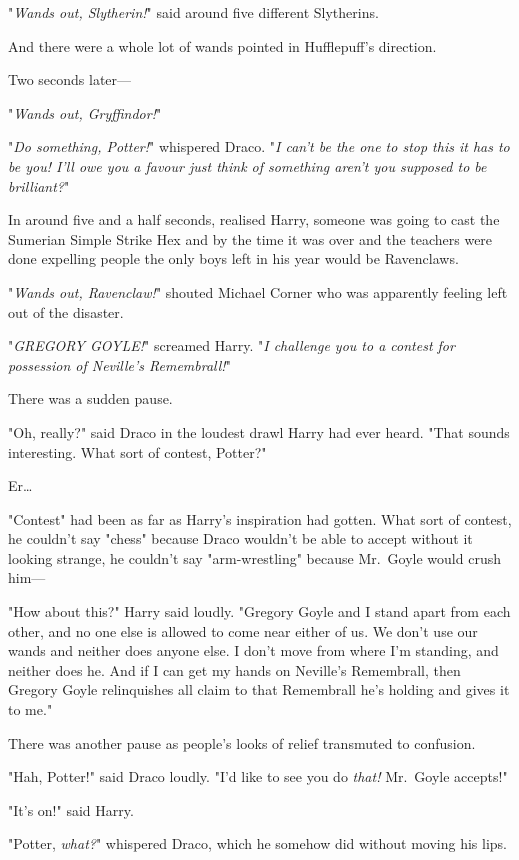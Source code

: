 "\emph{Wands out, Slytherin!}" said around five different Slytherins.

And there were a whole lot of wands pointed in Hufflepuff's direction.

Two seconds later---

"\emph{Wands out, Gryffindor!}"

"\emph{Do something, Potter!}" whispered Draco. "\emph{I can't be the one to 
stop this it has to be you! I'll owe you a favour just think of something 
aren't you supposed to be brilliant?}"

In around five and a half seconds, realised Harry, someone was going to cast 
the Sumerian Simple Strike Hex and by the time it was over and the teachers 
were done expelling people the only boys left in his year would be Ravenclaws.

"\emph{Wands out, Ravenclaw!}" shouted Michael Corner who was apparently 
feeling left out of the disaster.

"\emph{GREGORY GOYLE!}" screamed Harry. "\emph{I challenge you to a contest for 
possession of Neville's Remembrall!}"

There was a sudden pause.

"Oh, really?" said Draco in the loudest drawl Harry had ever heard. "That 
sounds interesting. What sort of contest, Potter?"

Er{\ldots}

"Contest" had been as far as Harry's inspiration had gotten. What sort of 
contest, he couldn't say "chess" because Draco wouldn't be able to accept 
without it looking strange, he couldn't say "arm-wrestling" because Mr.~Goyle 
would crush him---

"How about this?" Harry said loudly. "Gregory Goyle and I stand apart from each 
other, and no one else is allowed to come near either of us. We don't use our 
wands and neither does anyone else. I don't move from where I'm standing, and 
neither does he. And if I can get my hands on Neville's Remembrall, then 
Gregory Goyle relinquishes all claim to that Remembrall he's holding and gives 
it to me."

There was another pause as people's looks of relief transmuted to confusion.

"Hah, Potter!" said Draco loudly. "I'd like to see you do \emph{that!} 
Mr.~Goyle accepts!"

"It's on!" said Harry.

"Potter, \emph{what?}" whispered Draco, which he somehow did without moving his 
lips.

